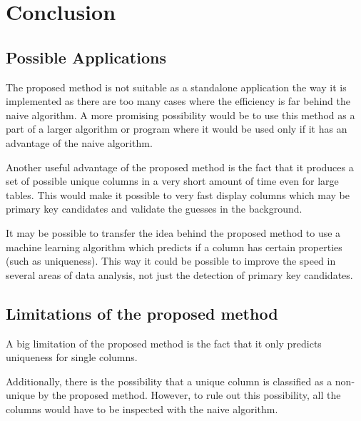 \chapter{Conclusion}

\section{Possible Applications}
The proposed method is not suitable as a standalone application the way it is implemented as there are too many cases where the efficiency is far behind the naive algorithm. A more promising possibility would be to use this method as a part of a larger algorithm or program where it would be used only if it has an advantage of the naive algorithm.

Another useful advantage of the proposed method is the fact that it produces a set of possible unique columns in a very short amount of time even for large tables. This would make it possible to very fast display columns which may be primary key candidates and validate the guesses in the background.

It may be possible to transfer the idea behind the proposed method to use a machine learning algorithm which predicts if a column has certain properties (such as uniqueness). This way it could be possible to improve the speed in several areas of data analysis, not just the detection of primary key candidates.


\section{Limitations of the proposed method}
A big limitation of the proposed method is the fact that it only predicts uniqueness for single columns. %

Additionally, there is the possibility that a unique column is classified as a non-unique by the proposed method. However, to rule out this possibility, all the columns would have to be inspected with the naive algorithm. %
